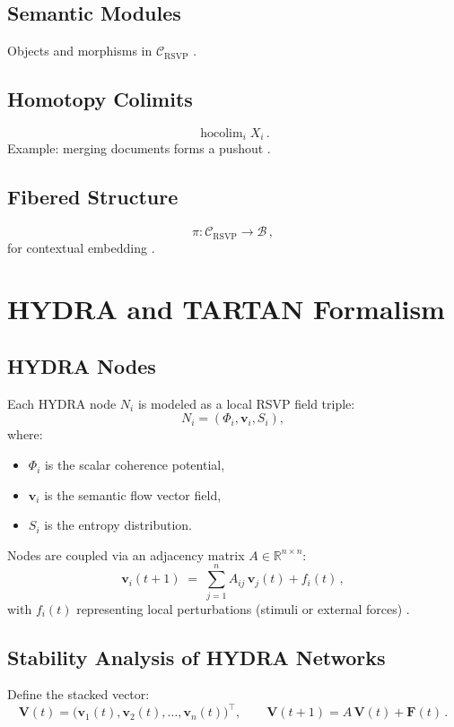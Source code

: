 \documentclass[12pt]{article}
\begin{document}
\subsection*{Semantic Modules}
Objects and morphisms in \(\mathcal{C}_{\text{RSVP}}\) \citep{maclane1998}.

\subsection*{Homotopy Colimits}
\[
\operatorname{hocolim}_i X_i \, .
\]
Example: merging documents forms a pushout \citep{hatcher2002, may1999}.

\subsection*{Fibered Structure}
\[
\pi: \mathcal{C}_{\text{RSVP}} \to \mathcal{B} \, ,
\]
for contextual embedding \citep{lawvere2009}.

\section*{HYDRA and TARTAN Formalism}

\subsection*{HYDRA Nodes}
Each HYDRA node \(N_i\) is modeled as a local RSVP field triple:
\[
N_i = (\Phi_i, \mathbf{v}_i, S_i),
\]
where:
\begin{itemize}
  \item \(\Phi_i\) is the scalar coherence potential,
  \item \(\mathbf{v}_i\) is the semantic flow vector field,
  \item \(S_i\) is the entropy distribution.
\end{itemize}

Nodes are coupled via an adjacency matrix \(A \in \mathbb{R}^{n \times n}\):
\[
\mathbf{v}_i(t+1) \;=\; \sum_{j=1}^n A_{ij}\,\mathbf{v}_j(t) + f_i(t) \, ,
\]
with \(f_i(t)\) representing local perturbations (stimuli or external forces) \citep{bird1988}.

\subsection*{Stability Analysis of HYDRA Networks}
Define the stacked vector:
\[
\mathbf{V}(t) = \big(\mathbf{v}_1(t), \mathbf{v}_2(t), \dots, \mathbf{v}_n(t)\big)^{\!\top}, 
\qquad \mathbf{V}(t+1) = A\,\mathbf{V}(t) + \mathbf{F}(t) \, .
\]
\end{document}
